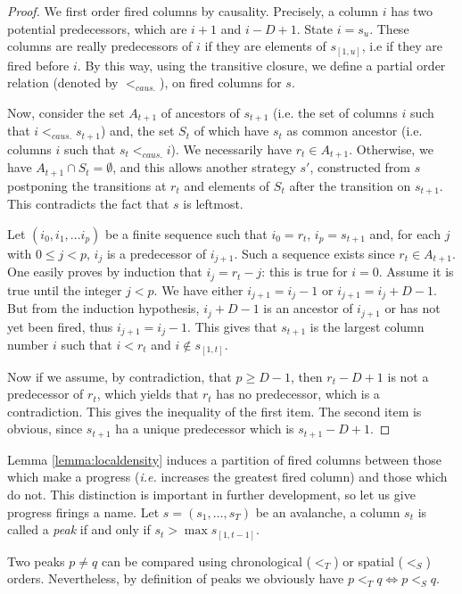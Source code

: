 \documentclass[11pt,a4paper]{llncs}
\begin{document}
\begin{proof}
We first order fired columns by causality. Precisely, a column $i$ has  two potential predecessors, which are
$i +1$ and   $ i - D+1$. State $i = s_u$. These columns are really predecessors of $i$ if they are elements of $s_{[1, u ]}$, i.e if they are fired before $i$. By this way, using the transitive closure,  we define a partial order relation (denoted by $<_{caus.}$),  on fired columns for $s$.

Now,  consider the set $A_{t+1 }$ of ancestors of $s_{t+1 }$ (i.e.  the set of columns $i$ such that $i <_{caus.} s_{t+1}$)  and,    the set $S_t$ of which have  $s_t$ as common ancestor (i.e. columns $i$ such that $s_t  <_{caus.} i$).
We necessarily have  $r_t \in A_{t+1 }$.   Otherwise, we have  $A_{t+1 } \cap S_t =  \emptyset$, and this  allows  another strategy $s'$, constructed from $s$ postponing the transitions at  $r_t$ and elements of $S_t$ after the transition on  $s_{t+1}$. This contradicts the fact that $s$ is leftmost.

Let  $(i_0, i_1, ...i_p)$ be a finite sequence such that $i_0 = r_t$, $i_p = s_{t+1}$ and,  for each $j$ with $0 \leq j < p$, $i_j$ is a predecessor of $i_{j+1}$. Such a sequence exists since $r_t \in A_{t+1 }$. One easily proves by induction that $i_j = r_t -j$: 
this is true for $i = 0$. Assume it is true until the integer $j < p$. We have either $i_{j+1} = i_j -1$ or  $i_{j+1} = i_j +D -1$. But from the induction hypothesis, $i_j +D -1$ is an ancestor of $i_{j+1}$ or has not yet been fired, thus $i_{j+1} = i_j -1$.  This gives that   $s_{t+1}$  is the largest column number $i$ such that $i < r_t$ and $i \notin s_{[1,t]}$. 

Now if we assume, by contradiction, that  $p \geq  D-1$, then  $r_t -D+1$ is not a predecessor of $r_t$, which yields that $r_t$ has no predecessor, which is a contradiction. This gives the  inequality   of the first item. 
The second item  is obvious, since $s_{t+1}$ ha a unique predecessor which is $s_{t+1}-D+1$. 
\end{proof}

Lemma \ref{lemma:localdensity} induces a partition of fired columns between those which make a progress ({\em i.e.} increases the greatest fired column) and those which do not. This distinction is important in further development, so let us give progress firings a name. Let $s=(s_1,\dots,s_T)$ be an avalanche, a column $s_{t}$ is called a {\em peak} if and only if $s_{t} > \max s_{[1,t-1]}$.

\begin{remark}\label{remark:order}
  Two peaks $p\not =q$ can be compared using chronological ($<_T$) or spatial ($<_S$) orders. Nevertheless, by definition of peaks we obviously have $p <_T q \iff p <_S q$.
\end{remark}
\end{document}
